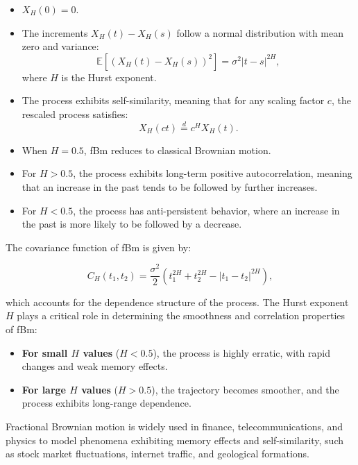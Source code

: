 \documentclass[11pt]{extarticle}
\begin{document}
\begin{itemize}
    \item \( X_H(0) = 0 \).
    \item The increments \( X_H(t) - X_H(s) \) follow a normal distribution with mean zero and variance:
    \begin{equation}
        \mathbb{E} \left[ (X_H(t) - X_H(s))^2 \right] = \sigma^2|t - s|^{2H},
    \end{equation}
    where \( H \) is the Hurst exponent.
    \item The process exhibits self-similarity, meaning that for any scaling factor \( c \), the rescaled process satisfies:
    \begin{equation}
        X_H(ct) \overset{d}{=} c^H X_H(t).
    \end{equation}
    \item When \( H = 0.5 \), fBm reduces to classical Brownian motion.
    \item For \( H > 0.5 \), the process exhibits long-term positive autocorrelation, meaning that an increase in the past tends to be followed by further increases.
    \item For \( H < 0.5 \), the process has anti-persistent behavior, where an increase in the past is more likely to be followed by a decrease.
\end{itemize}

The covariance function of fBm is given by:

\begin{equation}
    C_H(t_1, t_2) = \frac{\sigma^2}{2} \left( t_1^{2H} + t_2^{2H} - |t_1 - t_2|^{2H} \right),
    \label{eq:fbm_covariance}
\end{equation}

which accounts for the dependence structure of the process. The Hurst exponent \( H \) plays a critical role in determining the smoothness and correlation properties of fBm:

\begin{itemize}
    \item \textbf{For small \( H \) values} (\( H < 0.5 \)), the process is highly erratic, with rapid changes and weak memory effects.
    \item \textbf{For large \( H \) values} (\( H > 0.5 \)), the trajectory becomes smoother, and the process exhibits long-range dependence.
\end{itemize}

Fractional Brownian motion is widely used in finance, telecommunications, and physics to model phenomena exhibiting memory effects and self-similarity, such as stock market fluctuations, internet traffic, and geological formations.
\end{document}
